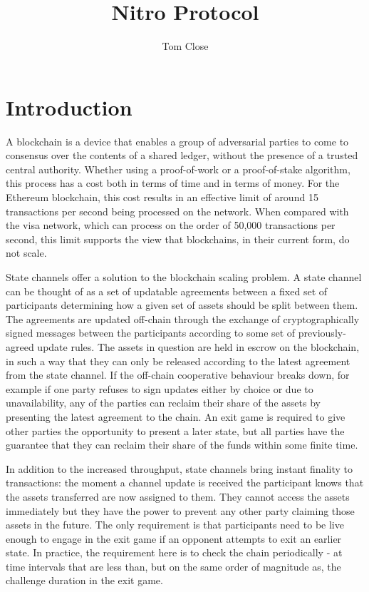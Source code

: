 \documentclass{article}
\title{Nitro Protocol}
\author{Tom Close}
\theoremstyle{definition}
\begin{document}
\maketitle

\section{Introduction}

A blockchain is a device that enables a group of adversarial parties to come to consensus over the contents of a shared ledger, without the presence of a trusted central authority. 
Whether using a proof-of-work or a proof-of-stake algorithm, this process has a cost both in terms of time and in terms of money.
For the Ethereum blockchain, this cost results in an effective limit of around 15 transactions per second being processed on the network.
When compared with the visa network, which can process on the order of 50,000 transactions per second, this limit supports the view that blockchains, in their current form, do not scale.

State channels offer a solution to the blockchain scaling problem.
A state channel can be thought of as a set of updatable agreements between a fixed set of participants determining how a given set of assets should be split between them.
The agreements are updated off-chain through the exchange of cryptographically signed messages between the participants according to some set of previously-agreed update rules. 
The assets in question are held in escrow on the blockchain, in such a way
that they can only be released according to the latest agreement from the state channel.
If the off-chain cooperative behaviour breaks down, for example if one party refuses to sign updates either by choice or due to unavailability, any of the parties can reclaim their share of the assets by presenting the latest agreement to the chain.
An exit game is required to give other parties the opportunity to present a later state, but all parties have the guarantee that they can reclaim their share of the funds within some finite time.

In addition to the increased throughput, state channels bring instant finality to transactions: the moment a channel update is received the participant knows that the assets transferred are now assigned to them.
They cannot access the assets immediately but they have the power to prevent any other party claiming those assets in the future.
The only requirement is that participants need to be live enough to engage in the exit game if an opponent attempts to exit an earlier state.
In practice, the requirement here is to check the chain periodically - at time intervals that are less than, but on the same order of magnitude as, the challenge duration in the exit game.
\end{document}
